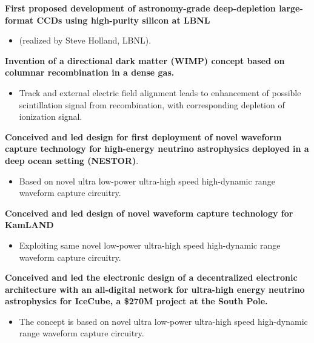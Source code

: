 \noindent\textbf{First proposed development of astronomy-grade deep-depletion large-format CCDs using high-purity silicon at LBNL } 
\begin{itemize}[noitemsep,nolistsep]
\item{(realized by Steve Holland, LBNL).}
\end{itemize}

\noindent\textbf{Invention of a directional dark matter (WIMP) concept based on columnar recombination in a dense gas.} 
\begin{itemize}[noitemsep,nolistsep]
\item{Track and external electric field alignment leads to enhancement of possible scintillation signal from recombination, with corresponding depletion of ionization signal.}
\end{itemize}


\noindent\textbf{Conceived and led design for first deployment of novel waveform capture technology for high-energy neutrino astrophysics deployed in a deep ocean setting (NESTOR)}. 
\begin{itemize}[noitemsep,nolistsep] 
\item{Based on novel ultra low-power ultra-high speed high-dynamic range waveform capture circuitry.}
\end{itemize}

\noindent\textbf{Conceived and led design of novel waveform capture technology for KamLAND}
\begin{itemize}[noitemsep,nolistsep] 
\item{Exploiting same novel low-power ultra-high speed high-dynamic range waveform capture circuitry.}
\end{itemize}

\noindent\textbf{Conceived and led the electronic design of a decentralized electronic architecture with an all-digital network for ultra-high energy neutrino astrophysics for IceCube, a  \$270M project at the South Pole.}
\begin{itemize}[noitemsep,nolistsep] 
\item{The concept is based on novel ultra low-power ultra-high speed high-dynamic range waveform capture circuitry.}
\end{itemize} 

